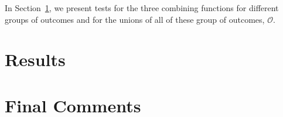 \noindent In Section~\ref{section:results}, we present tests for the three combining functions for different groups of outcomes and for the unions of all of these group of outcomes, $\mathcal{O}$.

\section{Results} \label{section:results}

\section{Final Comments} \label{section:conclusion}

\clearpage
\singlespace



 